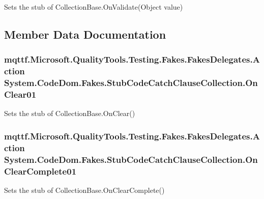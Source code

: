 Sets the stub of Collection\-Base.\-On\-Validate(\-Object value)



\subsection{Member Data Documentation}
\hypertarget{class_system_1_1_code_dom_1_1_fakes_1_1_stub_code_catch_clause_collection_ad3e55d07617203e94bcbacb7aa94055d}{
\subsubsection[{On\-Clear01}]{\setlength{\rightskip}{0pt plus 5cm}mqttf.\-Microsoft.\-Quality\-Tools.\-Testing.\-Fakes.\-Fakes\-Delegates.\-Action System.\-Code\-Dom.\-Fakes.\-Stub\-Code\-Catch\-Clause\-Collection.\-On\-Clear01}}\label{class_system_1_1_code_dom_1_1_fakes_1_1_stub_code_catch_clause_collection_ad3e55d07617203e94bcbacb7aa94055d}


Sets the stub of Collection\-Base.\-On\-Clear()

\hypertarget{class_system_1_1_code_dom_1_1_fakes_1_1_stub_code_catch_clause_collection_a9f519de764d7cf6c983a0111f5604f6e}{
\subsubsection[{On\-Clear\-Complete01}]{\setlength{\rightskip}{0pt plus 5cm}mqttf.\-Microsoft.\-Quality\-Tools.\-Testing.\-Fakes.\-Fakes\-Delegates.\-Action System.\-Code\-Dom.\-Fakes.\-Stub\-Code\-Catch\-Clause\-Collection.\-On\-Clear\-Complete01}}\label{class_system_1_1_code_dom_1_1_fakes_1_1_stub_code_catch_clause_collection_a9f519de764d7cf6c983a0111f5604f6e}


Sets the stub of Collection\-Base.\-On\-Clear\-Complete()

